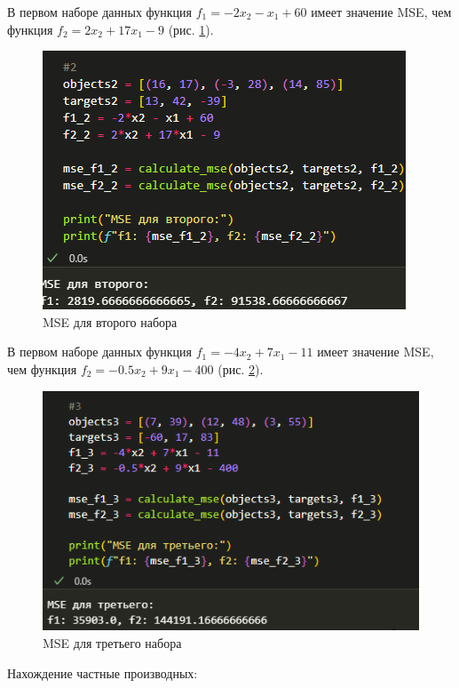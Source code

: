 \documentclass[14pt,a4paper]{extarticle}
\begin{document}
В первом наборе данных функция
$f_1=-2x_2-x_1+60$ имеет значение MSE, чем функция $f_2=2x_2+17x_1-9$ (рис. \ref{pic:mse2}).

\begin{figure}[ht!]
    \centering
    \includegraphics[width=0.9\linewidth]{figures/1.2.png}
    \caption{MSE для второго набора}
    \label{pic:mse2}
\end{figure}

В первом наборе данных функция
$f_1=-4x_2+7x_1-11$ имеет значение MSE, чем функция $f_2=-0.5x_2+9x_1-400$ (рис. \ref{pic:mse3}).

\begin{figure}[ht!]
    \centering
    \includegraphics[width=0.9\linewidth]{figures/1.3.png}
    \caption{MSE для третьего набора}
    \label{pic:mse3}
\end{figure}

Нахождение частные производных:
\end{document}
